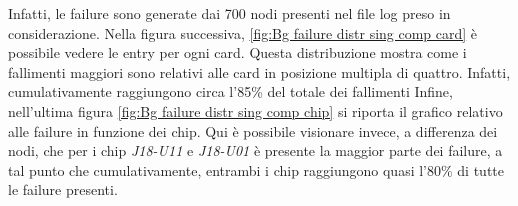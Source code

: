 Infatti, le failure sono generate dai 700 nodi presenti nel file log preso in considerazione.
Nella figura successiva, \ref{fig:Bg failure distr sing comp card} è possibile vedere le entry per ogni card. 
Questa distribuzione mostra come i fallimenti maggiori sono relativi alle card in posizione multipla di quattro. Infatti, cumulativamente raggiungono circa l'85\% del totale dei fallimenti
Infine, nell'ultima figura \ref{fig:Bg failure distr sing comp chip} si riporta il grafico relativo alle failure in funzione dei chip.
Qui è possibile visionare invece, a differenza dei nodi, che per i chip \textit{J18-U11} e \textit{J18-U01} è presente la maggior parte  dei failure, a tal punto che cumulativamente, entrambi i chip raggiungono quasi l'80\% di tutte le failure presenti.